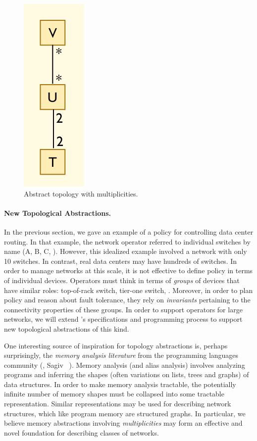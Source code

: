 \begin{figure}
  \centering
  \includegraphics[width=.1\textwidth]{figures/abstract-topo}
\caption{Abstract topology with multiplicities.}
  \label{fig:abstract-topo}
  \vspace{-1em}
\end{figure}

\paragraph*{New Topological Abstractions.}
In the previous section, we gave an example of a \Propane{} policy for
controlling data center routing.  In that example, the network operator
referred to individual switches by name (A, B, C, \etc).  However,
this idealized example involved a network with only 10 switches.  In
contrast, real data centers may have hundreds of switches.  In order to
manage networks at this scale, it is not effective to define policy in
terms of individual devices.  Operators must think 
in terms of \emph{groups} of devices that have similar roles:  top-of-rack switch,
tier-one switch, \etc.  Moreover, in order to plan policy and reason about
fault tolerance, they rely on \emph{invariants} pertaining to the 
connectivity properties of these groups.  
In order to support operators for large networks, we will extend
\Propane's specifications and programming process to support
new topological abstractions of this kind.

One interesting source of inspiration for topology abstractions is,
perhaps surprisingly, the
\emph{memory analysis literature} from the programming languages 
community (\eg, Sagiv \etal~\cite{sagiv+:shape-analysis}).
Memory analysis (and alias analysis) involves analyzing programs
and inferring the shapes (often variations on lists, trees and graphs)
of data structures.  In order to make memory analysis tractable, 
the potentially infinite number of memory shapes must be collapsed into
some tractable representation.  Similar representations may be used for
describing network structures, which like program memory are structured
graphs. In particular, we believe memory
abstractions involving \emph{multiplicities} may form an effective and
novel foundation for describing classes of networks. 

